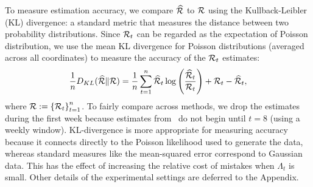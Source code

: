 To measure estimation accuracy, we compare $\widehat{\mathcal{R}}$ to $\mathcal{R}$ using
the Kullback-Leibler (KL) divergence: a standard metric that measures the
distance between two probability distributions. Since $\mathcal{R}_t$ can be regarded
as the expectation of Poisson distribution, we use the mean KL divergence for
Poisson distributions (averaged across all coordinates) to measure the accuracy
of the $\mathcal{R}_t$ estimates: $$\frac{1}{n} D_{KL}(\widehat{\mathcal{R}} \Vert \mathcal{R}) =
\frac{1}{n}\sum_{t=1}^n \widehat{\mathcal{R}}_t \log\left(\frac{\widehat{\mathcal{R}}_t}
{\mathcal{R}_t}\right) + {\mathcal{R}}_t - \widehat{\mathcal{R}}_t,$$  where $\mathcal{R} := \left\{ \mathcal{R}_t \right\}_{t=1}^n$.
To fairly compare across methods, we drop the estimates during the first
week because estimates from \EpiEstim\ do not begin until $t=8$ (using a weekly
window). KL-divergence is more appropriate for measuring accuracy because it
connects directly to the Poisson likelihood used to generate the data, whereas
standard measures like the mean-squared error correspond to Gaussian data. This
has the effect of increasing the relative cost of mistakes when $\Lambda_t$ is small.
Other details of the experimental settings are deferred to the Appendix. 

